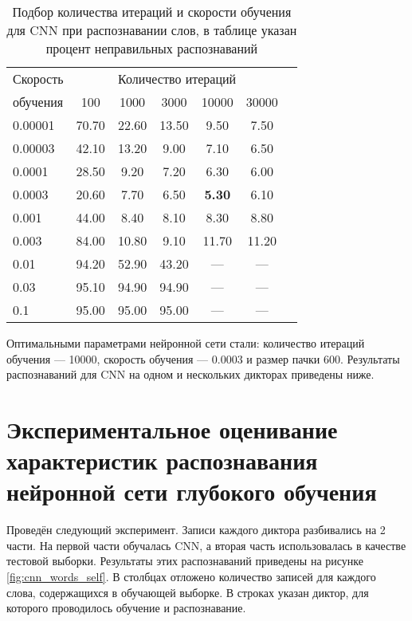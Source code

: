 \begin{table}[h]
	\centering
	\caption{Подбор количества итераций и скорости обучения для CNN при распознавании слов, в таблице указан процент неправильных распознаваний}
	\label{tab:cnn_bf_iter_pace}
	\begin{tabular}{| l | c | c | c | c | c | c |}
		\hline
		Скорость & \multicolumn{5}{c|}{Количество итераций} \\
		\hhline{~-----}
		обучения \phantom{00} & \phantom{000} 100 \phantom{000} & \phantom{000}1000\phantom{000} & \phantom{000}3000\phantom{000} & \phantom{00} 10000 \phantom{00} & \phantom{00} 30000 \phantom{00} \\
		\hline
		0.00001	& 70.70 & 22.60 & 13.50 &  9.50 &  7.50 \\
		0.00003	& 42.10 & 13.20 &  9.00 &  7.10 &  6.50 \\
		0.0001	& 28.50 &  9.20 &  7.20 &  6.30 &  6.00 \\
		0.0003	& 20.60 &  7.70 &  6.50 & \textbf{5.30} &  6.10 \\
		0.001	& 44.00 &  8.40 &  8.10 &  8.30 &  8.80 \\
		0.003	& 84.00 & 10.80 &  9.10 & 11.70 & 11.20 \\
		0.01	& 94.20 & 52.90 & 43.20 & \multicolumn{1}{c|}{---} & \multicolumn{1}{c|}{---} \\	
		0.03	& 95.10 & 94.90 & 94.90 & \multicolumn{1}{c|}{---} & \multicolumn{1}{c|}{---} \\	
		0.1		& 95.00 & 95.00 & 95.00 & \multicolumn{1}{c|}{---} & \multicolumn{1}{c|}{---} \\
		\hline
	\end{tabular}
\end{table}

Оптимальными параметрами нейронной сети стали: количество итераций обучения --- 10000, скорость обучения --- 0.0003 и размер пачки 600.
Результаты распознаваний для CNN на одном и нескольких дикторах приведены ниже.


\section{Экспериментальное оценивание характеристик распознавания нейронной сети глубокого обучения} \label{sect4_3}

Проведён следующий эксперимент.
Записи каждого диктора разбивались на 2 части.
На первой части обучалась CNN, а вторая часть использовалась в качестве тестовой выборки.
Результаты этих распознаваний приведены на рисунке \ref{fig:cnn_words_self}.
В столбцах отложено количество записей для каждого слова, содержащихся в обучающей выборке.
В строках указан диктор, для которого проводилось обучение и распознавание.

